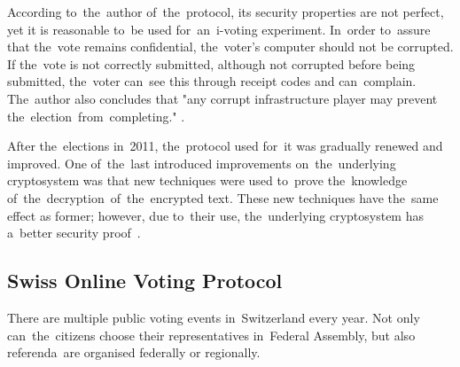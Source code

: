 According to~the~author of~the~protocol, its security properties are not perfect, yet it is reasonable to~be used for~an~i-voting experiment. In~order to~assure that the~vote remains confidential, the~voter's computer should not be corrupted. If the~vote is not correctly submitted, although not corrupted before being submitted, the~voter can~see this through receipt codes and can~complain. The~author also concludes that "any corrupt infrastructure player may prevent the~election~from~completing." \cite{Gjosteen2010}.

After the~elections in~2011, the~protocol used for~it was gradually renewed and improved. One of~the~last introduced improvements on~the~underlying cryptosystem was that new techniques were used to~prove the~knowledge of~the~decryption~of~the~encrypted text. These new techniques have the~same effect as former; however, due to~their use, the~underlying cryptosystem has a~better security proof~\cite{Gjosteen2015}.

\subsection{Swiss Online Voting Protocol}
There are multiple public voting events in~Switzerland every year. Not only can~the~citizens choose their representatives in~Federal Assembly, but also referenda~are organised federally or regionally. 

